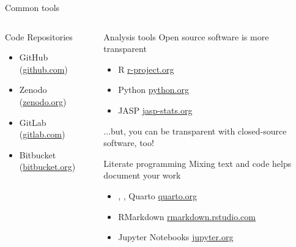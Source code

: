 \begin{block}{Common tools}
\begin{columns}[t]
\begin{column}{.45\linewidth}
      \begin{subblock}{\hfill Code Repositories\hfill {}}
      \begin{itemize}
        \item {} GitHub (\href{github.com}{github.com})
        \item Zenodo (\href{zenodo.org}{zenodo.org})
        \item {} GitLab (\href{gitlab.com}{gitlab.com})
        \item {} Bitbucket (\href{bitbucket.org}{bitbucket.org})
      \end{itemize}
    \end{subblock}

  \end{column}\hfill
   
  \begin{column}{.45\linewidth}

    \begin{subblock}{ \hfill Analysis tools\hfill {}}
      Open source software is more transparent \\ 
      \vspace{0.5em}
      \begin{itemize}
        \item {} R \href{https://www.r-project.org/}{r-project.org}
        \item {} Python \href{https://www.python.org/}{python.org}
        \item JASP \href{https://jasp-stats.org/}{jasp-stats.org}
      \end{itemize}

      ...but, you can be transparent with closed-source software, too!
    \end{subblock}
   
    \begin{subblock}{\hfill Literate programming\hfill {}}
      Mixing text and code helps document your work \\ 
      \begin{itemize}
        \item {}, ,   Quarto \href{https://quarto.org/}{quarto.org}
        \item {} RMarkdown \href{https://rmarkdown.rstudio.com/}{rmarkdown.rstudio.com}
        \item {} Jupyter Notebooks \href{https://jupyter.org/}{jupyter.org}
      \end{itemize}  
    \end{subblock}
    

\end{column}
\end{columns}
\end{block}
